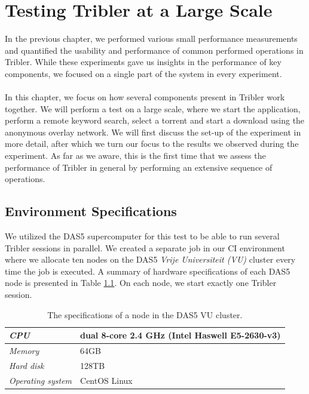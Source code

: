 \chapter{Testing Tribler at a Large Scale}
In the previous chapter, we performed various small performance measurements and quantified the usability and performance of common performed operations in Tribler. While these experiments gave us insights in the performance of key components, we focused on a single part of the system in every experiment.\\\\
In this chapter, we focus on how several components present in Tribler work together. We will perform a test on a large scale, where we start the application, perform a remote keyword search, select a torrent and start a download using the anonymous overlay network. We will first discuss the set-up of the experiment in more detail, after which we turn our focus to the results we observed during the experiment. As far as we aware, this is the first time that we assess the performance of Tribler in general by performing an extensive sequence of operations.

\section{Environment Specifications}
We utilized the DAS5 supercomputer for this test to be able to run several Tribler sessions in parallel. We created a separate job in our CI environment where we allocate ten nodes on the DAS5 \emph{Vrije Universiteit (VU)} cluster every time the job is executed. A summary of hardware specifications of each DAS5 node is presented in Table \ref{table:das5-node-specifications}. On each node, we start exactly one Tribler session.

\begin{table}[h!]
	\centering
	\begin{tabular}{|l|l|}
		\hline
		\emph{CPU} & dual 8-core 2.4 GHz (Intel Haswell E5-2630-v3)\\ \hline
		\emph{Memory} & 64GB \\ \hline
		\emph{Hard disk} & 128TB \\ \hline
		\emph{Operating system} & CentOS Linux \\ \hline
	\end{tabular}
	\caption{The specifications of a node in the DAS5 VU cluster.}
	\label{table:das5-node-specifications}
\end{table}


